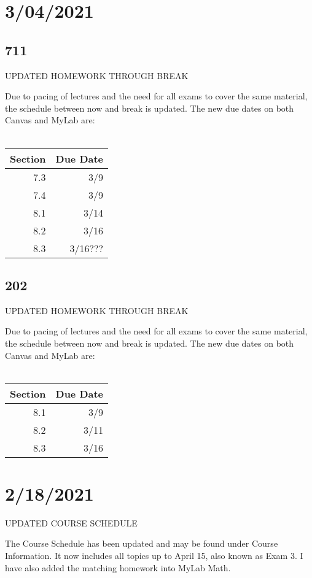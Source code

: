 \documentclass[]{article}
\begin{document}
\section*{3/04/2021}
\subsection*{711}
UPDATED HOMEWORK THROUGH BREAK

Due to pacing of lectures and the need for all exams to cover the same material, the schedule between now and break is updated. The new due dates on both Canvas and MyLab are:\\\\
\bgroup
\def\arraystretch{1.5}
\begin{tabular}{|r|r|}
	\hline
	Section & Due Date \\
	\hline
	7.3 & 3/9 \\
	\hline
	7.4 & 3/9 \\
	\hline
	8.1 & 3/14 \\
	\hline
	8.2 & 3/16 \\
	\hline
	8.3 & 3/16??? \\
	\hline
\end{tabular}
\egroup

\subsection*{202}
UPDATED HOMEWORK THROUGH BREAK

Due to pacing of lectures and the need for all exams to cover the same material, the schedule between now and break is updated. The new due dates on both Canvas and MyLab are:\\\\
\bgroup
\def\arraystretch{1.5}
\begin{tabular}{|r|r|}
	\hline
	Section & Due Date \\
	\hline
	8.1 & 3/9 \\
	\hline
	8.2 & 3/11 \\
	\hline
	8.3 & 3/16 \\
	\hline
\end{tabular}
\egroup

	
\section*{2/18/2021}
UPDATED COURSE SCHEDULE

The Course Schedule has been updated and may be found under Course Information. It now includes all topics up to April 15, also known as Exam 3. I have also added the matching homework into MyLab Math.
\end{document}
